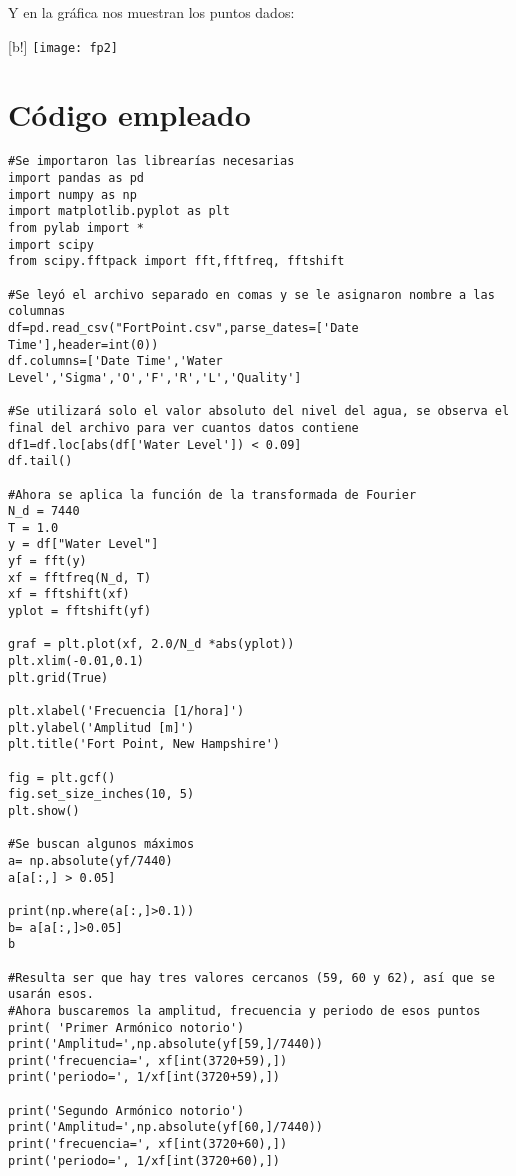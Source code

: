 \documentclass[12pt,a4paper]{article}
\begin{document}
Y en la gráfica nos muestran los puntos dados:

\begin{center}[b!]
\texttt{[image: fp2]}
\end{center}

\newpage

\section{Código empleado}

\begin{verbatim}
#Se importaron las librearías necesarias
import pandas as pd
import numpy as np
import matplotlib.pyplot as plt
from pylab import *
import scipy
from scipy.fftpack import fft,fftfreq, fftshift

#Se leyó el archivo separado en comas y se le asignaron nombre a las columnas
df=pd.read_csv("FortPoint.csv",parse_dates=['Date Time'],header=int(0))
df.columns=['Date Time','Water Level','Sigma','O','F','R','L','Quality']

#Se utilizará solo el valor absoluto del nivel del agua, se observa el final del archivo para ver cuantos datos contiene
df1=df.loc[abs(df['Water Level']) < 0.09]
df.tail()

#Ahora se aplica la función de la transformada de Fourier
N_d = 7440
T = 1.0
y = df["Water Level"] 
yf = fft(y)
xf = fftfreq(N_d, T)
xf = fftshift(xf)
yplot = fftshift(yf)

graf = plt.plot(xf, 2.0/N_d *abs(yplot))
plt.xlim(-0.01,0.1)
plt.grid(True)

plt.xlabel('Frecuencia [1/hora]')
plt.ylabel('Amplitud [m]')
plt.title('Fort Point, New Hampshire')

fig = plt.gcf()
fig.set_size_inches(10, 5)
plt.show()

#Se buscan algunos máximos
a= np.absolute(yf/7440)
a[a[:,] > 0.05]

print(np.where(a[:,]>0.1))
b= a[a[:,]>0.05]
b

#Resulta ser que hay tres valores cercanos (59, 60 y 62), así que se usarán esos.
#Ahora buscaremos la amplitud, frecuencia y periodo de esos puntos
print( 'Primer Armónico notorio')
print('Amplitud=',np.absolute(yf[59,]/7440))
print('frecuencia=', xf[int(3720+59),])
print('periodo=', 1/xf[int(3720+59),])

print('Segundo Armónico notorio')
print('Amplitud=',np.absolute(yf[60,]/7440))
print('frecuencia=', xf[int(3720+60),])
print('periodo=', 1/xf[int(3720+60),])


\end{verbatim}
\end{document}
